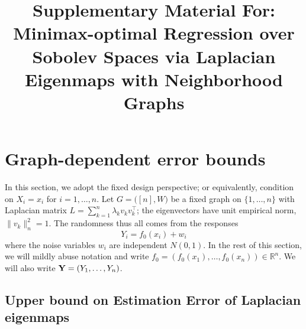 \documentclass[aos]{imsart}
\theoremstyle{plain}
\theoremstyle{definition}
\theoremstyle{remark}
\def\R{\mathbb{R}}
\newcommand{\Reals}{\mathbb{R}} %
\newcommand{\1}{\mathbf{1}}
\begin{document}
\begin{frontmatter}

\title{Supplementary Material For: Minimax-optimal Regression over Sobolev Spaces via Laplacian Eigenmaps with Neighborhood Graphs}


\end{frontmatter}


\section{Graph-dependent error bounds}
\label{sec:fixed_graph_error_bounds}
In this section, we adopt the fixed design perspective; or equivalently, condition on $X_i = x_i$ for $i = 1,\ldots,n$. Let $G = \bigl([n],W\bigr)$ be a fixed graph on $\{1,\ldots,n\}$ with Laplacian matrix $L = \sum_{k = 1}^{n}\lambda_k v_k v_k^{\top}$; the eigenvectors have unit empirical norm, $\|v_k\|_n^2 = 1$. The randomness thus all comes from the responses 
\begin{equation}
\label{eqn:fixed_graph_regression_model}
Y_i = f_{0}(x_i) + w_i
\end{equation}
where the noise variables $w_i$ are independent $N(0,1)$. In the rest of this section, we will mildly abuse notation and write $f_0 = (f_0(x_1),\ldots,f_0(x_n)) \in \Reals^n$. We will also write ${\bf Y} = (Y_1,\ldots,Y_n)$.

\subsection{Upper bound on Estimation Error of Laplacian eigenmaps}
\end{document}
